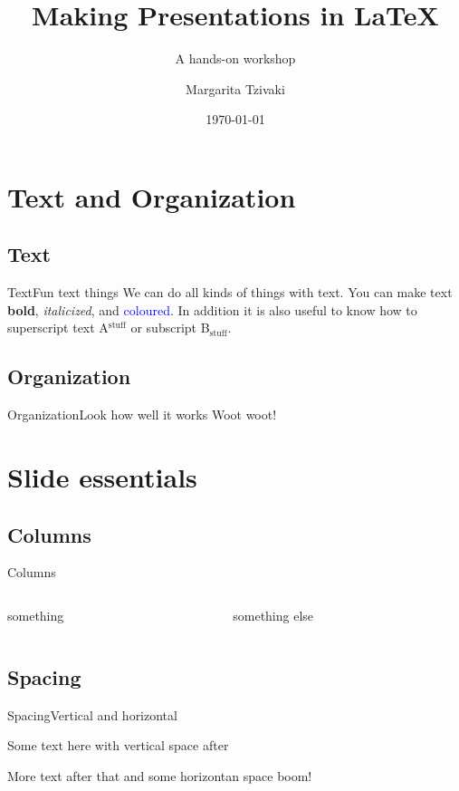\documentclass[xcolor={dvipsnames}]{beamer}
\title[LaTeX Presentations]{Making Presentations in \LaTeX}
\subtitle{A hands-on workshop}
\date{\today}
\author{Margarita Tzivaki}
\institute[ASC]{Academic Skills Club}
\begin{document}
\frame{\maketitle}
\section{Text and Organization}
\subsection{Text}
\begin{frame}{Text}{Fun text things}
We can do all kinds of things with text. You can make text \textbf{bold}, 
\emph{italicized}, and \textcolor{blue}{coloured}. In addition it is also 
useful to know how to superscript text A${}^{\text{stuff}}$ or subscript 
B${}_{\text{stuff}}$. 
\end{frame}
\subsection{Organization}
\begin{frame}{Organization}{Look how well it works}
Woot woot!
\end{frame}

\section{Slide essentials}
\subsection{Columns}
\begin{frame}{Columns}

\begin{columns}
\begin{column}{0.5\textwidth}
something
\end{column}
\begin{column}{0.5\textwidth}
something else
\end{column}
\end{columns}

\end{frame}
\subsection{Spacing}
\begin{frame}{Spacing}{Vertical and horizontal}

Some text here with vertical space after

\vspace{2cm}

More text after that and some horizontan space \hspace{1cm} boom!

\end{frame}
\end{document}
